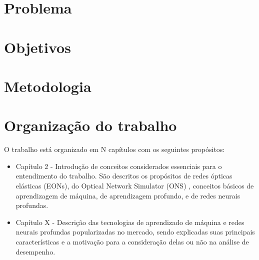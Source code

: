 

\section{Problema}
\label{intro-problem}






\section{Objetivos}

\section{Metodologia}

\section{Organização do trabalho}

O trabalho está organizado em N \todo capítulos com os seguintes propósitos:

\begin{itemize}
  \item Capítulo 2 - Introdução de conceitos considerados essenciais para o entendimento do trabalho. São descritos os propósitos de redes ópticas elásticas (EONs), do Optical Network Simulator (ONS) \cite{costa2016ons}, conceitos básicos de aprendizagem de máquina, de aprendizagem profundo, e de redes neurais profundas.


  \item Capítulo X \todo - Descrição das tecnologias de aprendizado de máquina e redes neurais profundas popularizadas no mercado, sendo explicadas suas principais características e a motivação para a consideração delas ou não na análise de desempenho.
\end{itemize}





